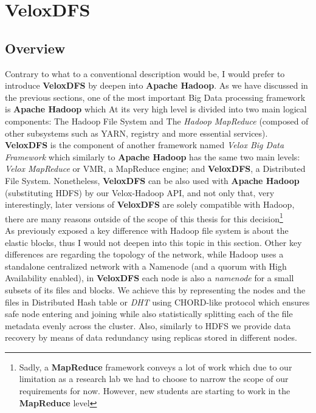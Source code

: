 \section{VeloxDFS}
\subsection{Overview}

Contrary to what to a conventional description would be, I would prefer to
introduce \textbf{VeloxDFS} by deepen into \textbf{Apache Hadoop}.  As we have
discussed in the previous sections, one of the most important Big Data
processing framework is \textbf{Apache Hadoop} which At its very high level is
divided into two main logical components: The Hadoop File System and The
\textit{Hadoop MapReduce} (composed of other subsystems such as YARN, registry
and more essential services).  \\

\textbf{VeloxDFS} is the component of another framework named \textit{Velox Big
Data Framework} which similarly to \textbf{Apache Hadoop} has the same two main
levels: \textit{Velox MapReduce} or VMR, a MapReduce engine; and
\textbf{VeloxDFS}, a Distributed File System.  Nonetheless, \textbf{VeloxDFS}
can be also used with \textbf{Apache Hadoop} (substituting HDFS) by our
Velox-Hadoop API, and not only that, very interestingly, later versions of
\textbf{VeloxDFS} are solely compatible with Hadoop, there are many reasons
outside of the scope of this thesis for this decision\footnote{Sadly, a
\textbf{MapReduce} framework conveys a lot of work which due to our limitation
as a research lab we had to choose to narrow the scope of our requirements for
now. However, new students are starting to work in the \textbf{MapReduce}
level}  \\

As previously exposed a key difference with Hadoop file system is about the
elastic blocks, thus I would not deepen into this topic in this section. Other
key differences are regarding the topology of the network, while Hadoop uses a
standalone centralized network with a Namenode (and a quorum with High
Availability enabled), in  \textbf{VeloxDFS} each node is also a
\textit{namenode} for a small subsets of its files and blocks. We achieve this
by representing the nodes and the files in Distributed Hash table or
\textit{DHT} using CHORD-like protocol \cite{stoica2001chord} which ensures
safe node entering and joining while also statistically splitting each of the
file metadata evenly across the cluster. Also, similarly to HDFS we provide
data recovery by means of data redundancy using replicas stored in different
nodes.  \\ 

